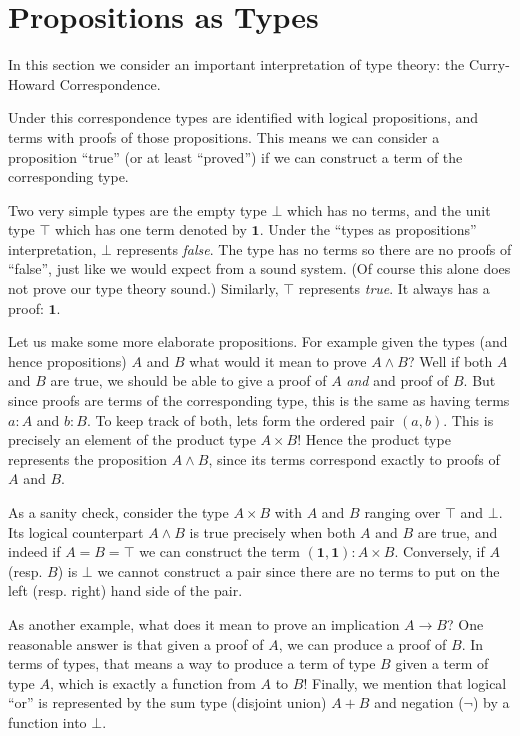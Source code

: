 \section{Propositions as Types}\label{sec:typesandprops}

In this section we consider an important interpretation of type theory: the
Curry-Howard Correspondence.

Under this correspondence types are identified with logical propositions, and
terms with proofs of those propositions. This means we can consider a
proposition ``true'' (or at least ``proved'') if we can construct a term of the
corresponding type.

Two very simple types are the empty type $\bot$ which has no terms, and the
unit type $\top$ which has one term denoted by $\mathbf{1}$.
Under the ``types as propositions'' interpretation, $\bot$ represents
\emph{false}. The type has no terms so there are no proofs of ``false'', just
like we would expect from a sound system. (Of course this alone does not prove
our type theory sound.) Similarly, $\top$ represents \emph{true}. It always has
a proof: $\mathbf{1}$.

Let us make some more elaborate propositions. For example given the types (and
hence propositions) $A$ and $B$ what would it mean to prove $A \land B$? Well if
both $A$ and $B$ are true, we should be able to give a proof of $A$ \emph{and}
and proof of $B$. But since proofs are terms of the corresponding type, this is
the same as having terms $a : A$ and $b : B$. To keep track of both, lets form
the ordered pair $(a, b)$. This is precisely an element of the product type $A
\times B$! Hence the product type represents the proposition $A \land B$, since
its terms correspond exactly to proofs of $A$ and $B$.

As a sanity check, consider the type $A \times B$ with $A$ and $B$
ranging over $\top$ and $\bot$. Its logical counterpart $A \land B$ is true
precisely when both $A$ and $B$ are true, and indeed if $A = B = \top$ we can
construct the term $(\mathbf{1}, \mathbf{1}) : A \times B$. Conversely, if
$A$ (resp. $B$) is $\bot$ we cannot construct a pair since there are no terms to put on the
left (resp. right) hand side of the pair.

As another example, what does it mean to prove an implication $A \rightarrow B$?
One reasonable answer is that given a proof of $A$, we can produce a proof of
$B$. In terms of types, that means a way to produce a term of type $B$ given a
term of type $A$, which is exactly a function from $A$ to $B$! Finally, we
mention that logical ``or'' is represented by the sum type (disjoint union) $A +
B$ and negation ($\neg$) by a function into $\bot$.

